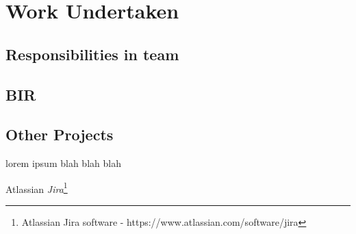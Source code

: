 \chapter{Work Undertaken}

\section{Responsibilities in team}

\section{BIR}

\section{Other Projects}

lorem ipsum blah blah blah

Atlassian \textit{Jira}\footnote{Atlassian Jira software - https://www.atlassian.com/software/jira}
